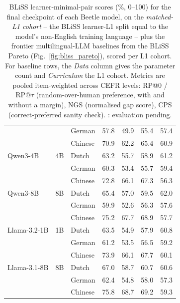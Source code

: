 \begin{table}[t]
\begin{tabular}{lll cccc}
 &  & German & 57.8 & 49.9 & 55.4 & 57.4 \\
 &  & Chinese & 70.9 & 62.2 & 65.4 & 60.9 \\
Qwen3-4B & 4B & Dutch & 63.2 & 55.7 & 58.9 & 61.2 \\
 &  & German & 60.3 & 53.4 & 55.7 & 59.4 \\
 &  & Chinese & 72.8 & 66.1 & 67.3 & 56.3 \\
Qwen3-8B & 8B & Dutch & 65.4 & 57.0 & 59.5 & 62.0 \\
 &  & German & 59.9 & 52.6 & 56.3 & 57.6 \\
 &  & Chinese & 75.2 & 67.7 & 68.9 & 57.7 \\
Llama-3.2-1B & 1B & Dutch & 63.5 & 54.9 & 57.9 & 60.8 \\
 &  & German & 61.2 & 53.5 & 56.5 & 59.2 \\
 &  & Chinese & 73.9 & 66.1 & 67.7 & 60.1 \\
Llama-3.1-8B & 8B & Dutch & 67.0 & 58.7 & 60.7 & 60.6 \\
 &  & German & 62.4 & 54.8 & 58.0 & 57.3 \\
 &  & Chinese & 75.8 & 68.7 & 69.2 & 59.3 \\
\bottomrule
\end{tabular}
\caption{BLiSS learner-minimal-pair scores (\%, 0--100) for the final checkpoint of each Beetle model, on the \emph{matched-L1 cohort} -- the BLiSS learner-L1 split equal to the model's non-English training language -- plus the frontier multilingual-LLM baselines from the BLiSS Pareto (Fig.~\ref{fig:bliss_pareto}), scored per L1 cohort. For baseline rows, the \emph{Data} column gives the parameter count and \emph{Curriculum} the L1 cohort. Metrics are pooled item-weighted across CEFR levels: RP@0 / RP@$\tau$ (random-over-human preference, with and without a margin), NGS (normalised gap score), CPS (correct-preferred sanity check). \pend: evaluation pending.}
\label{tab:bliss_matched}
\end{table}

